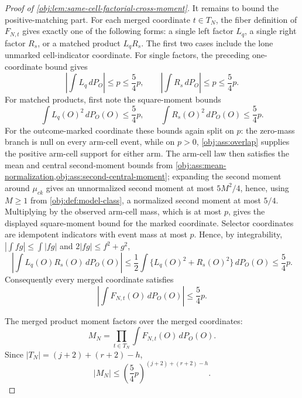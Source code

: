 \begin{proof}[Proof of \cref{obj:lem:same-cell-factorial-cross-moment}]
It remains to bound the positive-matching part.  For each merged coordinate \(t\in T_N\), the fiber definition of \(F_{N,t}\) gives exactly one of the following forms: a single left factor \(L_q\), a single right factor \(R_s\), or a matched product \(L_qR_s\). The first two cases include the lone unmarked cell-indicator coordinate. For single factors, the preceding one-coordinate bound gives
\[
\left|\int L_q\,dP_O\right|\le p\le \frac54p,
\qquad
\left|\int R_s\,dP_O\right|\le p\le \frac54p.
\]
For matched products, first note the square-moment bounds
\[
\int L_q(O)^2\,dP_O(O)\le \frac54p,
\qquad
\int R_s(O)^2\,dP_O(O)\le \frac54p.
\]
For the outcome-marked coordinate these bounds again split on \(p\): the zero-mass branch is null on every arm-cell event, while on \(p>0\), \cref{obj:ass:overlap} supplies the positive arm-cell support for either arm. The arm-cell law then satisfies the mean and central second-moment bounds from \cref{obj:ass:mean-normalization,obj:ass:second-central-moment}; expanding the second moment around \(\mu_{ck}\) gives an unnormalized second moment at most \(5M^2/4\), hence, using \(M\ge1\) from \cref{obj:def:model-class}, a normalized second moment at most \(5/4\). Multiplying by the observed arm-cell mass, which is at most \(p\), gives the displayed square-moment bound for the marked coordinate. Selector coordinates are idempotent indicators with event mass at most \(p\). Hence, by integrability, \(|\int fg|\le\int|fg|\) and \(2|fg|\le f^2+g^2\),
\[
\left|\int L_q(O)R_s(O)\,dP_O(O)\right|
\le
\frac12\int\{L_q(O)^2+R_s(O)^2\}\,dP_O(O)
\le
\frac54p.
\]
Consequently every merged coordinate satisfies
\[
\left|
\int F_{N,t}(O)\,dP_O(O)
\right|
\le
\frac54p.
\]

The merged product moment factors over the merged coordinates:
\[
M_N=\prod_{t\in T_N}\int F_{N,t}(O)\,dP_O(O).
\]
Since \(|T_N|=(j+2)+(r+2)-h\),
\[
|M_N|
\le
\left(\frac54p\right)^{(j+2)+(r+2)-h}.
\]


\end{proof}
